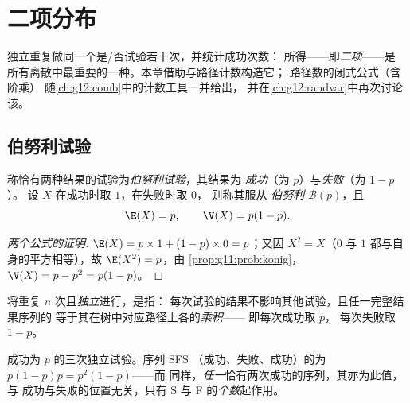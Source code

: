 \chapter{二项分布}\label{ch:g11:binom}

独立重复做同一个是/否试验若干次，并统计成功次数：
所得——即\emph{二项}——是
所有离散中最重要的一种。本章借助与路径计数构造它；
路径数的闭式公式（含阶乘）
随\cref{ch:g12:comb}中的计数工具一并给出，
并在\cref{ch:g12:randvar}中再次讨论该。

\section{伯努利试验}

\begin{definition}[伯努利试验]\label{def:g11:binom:bernoulli}
称恰有两种结果的试验为\emph{伯努利试验}，其结果为
\emph{成功}（为 $p$）与\emph{失败}（为 $1 - p$）。
设 $X$ 在成功时取 $1$，在失败时取 $0$，
则称其服从
\emph{伯努利} $\mathcal B(p)$，且
\[
\E(X) = p,
\qquad
\V(X) = p(1 - p).
\]
\end{definition}

\begin{proof}[两个公式的证明]
$\E(X) = p \times 1 + (1-p) \times 0 = p$；又因 $X^2 = X$（$0$
与 $1$ 都与自身的平方相等），故 $\E(X^2) = p$，由
\cref{prop:g11:prob:konig}，$\V(X) = p - p^2 = p(1-p)$。
\end{proof}

\begin{definition}[重复独立试验]\label{def:g11:binom:repeated}
将重复 $n$ 次且\emph{独立}进行，是指：
每次试验的结果不影响其他试验，且任一完整结果序列的
等于其在树中对应路径上各的\emph{乘积}——
即每次成功取 $p$，
每次失败取 $1 - p$。
\end{definition}

\begin{example}\label{ex:g11:binom:threetrials}
成功为 $p$ 的三次独立试验。序列 SFS
（成功、失败、成功）的为 $p(1-p)p = p^2(1-p)$——而
同样，\emph{任一}恰有两次成功的序列，其亦为此值，与
成功与失败的位置无关，只有 S 与 F 的\emph{个数}起作用。
\end{example}


